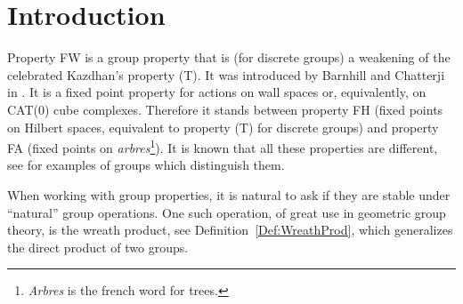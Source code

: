 %
%
%
%
%
%
%
%
%
%
\section{Introduction}
%
%
%
%
%
Property FW is a group property that is (for discrete groups) a weakening of the celebrated Kazdhan's property (T). It was introduced by Barnhill and Chatterji in \cite{Barnhill2008}. It is a fixed point property for actions on wall spaces or, equivalently, on CAT(0) cube complexes. Therefore it stands between property FH (fixed points on Hilbert spaces, equivalent to property (T) for discrete groups) and property FA (fixed points on \emph{arbres}\footnote{\emph{Arbres} is the french word for trees.}). It is known that all these properties are different, see  \cite{Cornulier2013} for examples of groups which distinguish them.

When working with group properties, it is natural to ask if they are stable under ``natural'' group operations. One such operation, of great use in geometric group theory, is the wreath product, see Definition~\ref{Def:WreathProd}, which generalizes the direct product of two groups.
%

